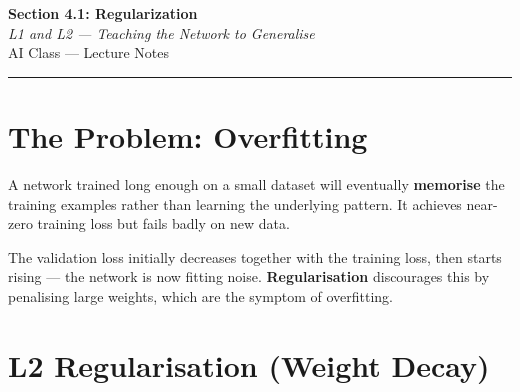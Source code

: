 \documentclass[12pt, a4paper]{article}
\newif\ifstudentmode
\theoremstyle{definition}
\begin{document}
\begin{center}
  {\LARGE \textbf{Section 4.1: Regularization}} \\[0.3em]
  {\large\itshape L1 and L2 — Teaching the Network to Generalise} \\[0.5em]
  {\large AI Class --- Lecture Notes}%
  \ifstudentmode\quad{\normalsize\color{gray}[Student Copy]}\fi
\end{center}

\vspace{1em}\hrule\vspace{1.5em}

\section{The Problem: Overfitting}

A network trained long enough on a small dataset will eventually
\textbf{memorise} the training examples rather than learning the underlying
pattern.  It achieves near-zero training loss but fails badly on new data.

\begin{center}
\end{center}

The validation loss initially decreases together with the training loss,
then starts rising --- the network is now fitting noise.
\textbf{Regularisation} discourages this by penalising large weights,
which are the symptom of overfitting.

\section{L2 Regularisation (Weight Decay)}
\end{document}
